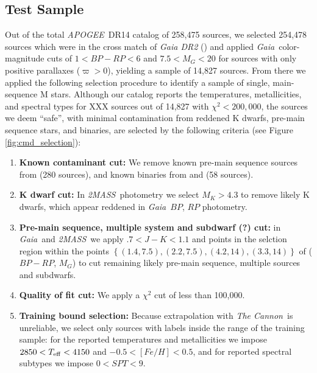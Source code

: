 \documentclass[modern]{aastex62}
\newcommand{\apogee}{\textsl{APOGEE}}
\newcommand{\thecannon}{\textsl{The Cannon}}
\newcommand{\gaia}{\textsl{Gaia}}
\newcommand{\zmass}{\textsl{2MASS}}
\begin{document}
\subsection{Test Sample \label{subsec:test_selection}} 
Out of the total \apogee\ DR14 catalog of 258,475 sources, we selected 254,478 sources which were in the cross match of \textsl{Gaia DR2} (\citealt{Brown:2018}) and applied \gaia\ color-magnitude cuts of $1<BP-RP<6$ and $7.5<M_G<20$ for sources with only positive parallaxes ($\varpi>0$), yielding a sample of 14,827 sources. From there we applied the following selection procedure to identify a sample of single, main-sequence M stars. Although our catalog reports the temperatures, metallicities, and spectral types for XXX sources out of 14,827 with $\chi^2<200,000$, the sources we deem ``safe'', with minimal contamination from reddened K dwarfs, pre-main sequence stars, and binaries, are selected by the following criteria (see Figure \ref{fig:cmd_selection}):

\begin{enumerate}
\item \textbf{Known contaminant cut:} We remove known pre-main sequence sources from \citealt{Cottaar:2014} (280 sources), and known binaries from \citealt{ElBadry:2018} and \citealt{Skinner:2018} (58 sources).

\item \textbf{K dwarf cut:} In \zmass\ photometry we select $M_K > 4.3$ to remove likely K dwarfs, which appear reddened in \gaia\ $BP$, $RP$ photometry.

\item \textbf{Pre-main sequence, multiple system and subdwarf (?) cut:} in \gaia\ and \zmass\ we apply $.7<J-K<1.1$ and points in the selction region within the points $\left\{ (1.4, 7.5), (2.2, 7.5), (4.2, 14), (3.3, 14) \right\}$ of ($BP-RP$, $M_G$) to cut remaining likely pre-main sequence, multiple sources and subdwarfs.

\item \textbf{Quality of fit cut:} We apply a $\chi^2$ cut of less than 100,000.

\item \textbf{Training bound selection:} Because extrapolation with \thecannon\ is unreliable, we select only sources with labels inside the range of the training sample: for the reported temperatures and metallicities we impose $2850<T_{\rm eff}<4150$ and $-0.5<[Fe/H]<0.5$, and for reported spectral subtypes we impose $0<SPT<9$.
\end{enumerate}
\end{document}
